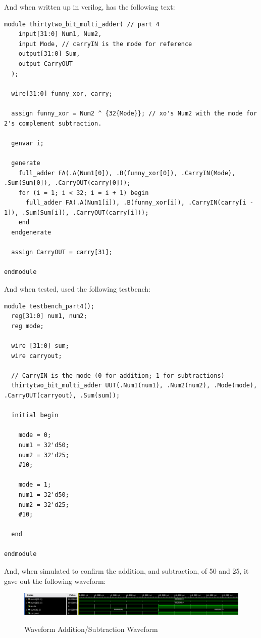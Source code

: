 And when written up in verilog, has the following text:
\begin{lstlisting}[label={label}, style=Verilog]
module thirtytwo_bit_multi_adder( // part 4
    input[31:0] Num1, Num2,
    input Mode, // carryIN is the mode for reference
    output[31:0] Sum,
    output CarryOUT
  );
  
  wire[31:0] funny_xor, carry;

  assign funny_xor = Num2 ^ {32{Mode}}; // xo's Num2 with the mode for 2's complement subtraction.
  
  genvar i;

  generate
    full_adder FA(.A(Num1[0]), .B(funny_xor[0]), .CarryIN(Mode), .Sum(Sum[0]), .CarryOUT(carry[0]));
    for (i = 1; i < 32; i = i + 1) begin
      full_adder FA(.A(Num1[i]), .B(funny_xor[i]), .CarryIN(carry[i - 1]), .Sum(Sum[i]), .CarryOUT(carry[i]));
    end
  endgenerate
  
  assign CarryOUT = carry[31];

endmodule
\end{lstlisting}

And when tested, used the following testbench:
\begin{lstlisting}[label={label}, style=Verilog]
module testbench_part4();
  reg[31:0] num1, num2;
  reg mode;
  
  wire [31:0] sum;
  wire carryout;
  
  // CarryIN is the mode (0 for addition; 1 for subtractions)
  thirtytwo_bit_multi_adder UUT(.Num1(num1), .Num2(num2), .Mode(mode), .CarryOUT(carryout), .Sum(sum));

  initial begin

    mode = 0;
    num1 = 32'd50;
    num2 = 32'd25;
    #10;

    mode = 1;
    num1 = 32'd50;
    num2 = 32'd25;
    #10;

  end

endmodule
\end{lstlisting}
\newpage
And, when simulated to confirm the addition, and subtraction, of 50 and 25, it gave out the following waveform:
\begin{figure}[!htbp]
    \centering
    \caption{Waveform Addition/Subtraction Waveform}
    \includegraphics[width=1\textwidth]{part-4-waveform.png}
    \label{Waveform Part 4}
\end{figure}

